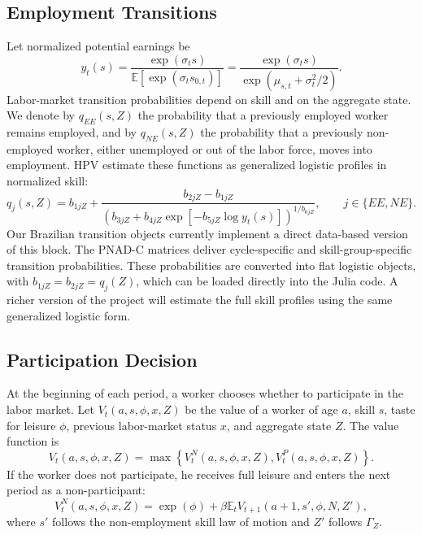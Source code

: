 \documentclass[12pt]{article}
\begin{document}
	\subsection{Employment Transitions}
	
	Let normalized potential earnings be
	\begin{equation}
		y_t(s)=\frac{\exp(\sigma_t s)}{\mathbb{E}[\exp(\sigma_t s_{0,t})]}
		=\frac{\exp(\sigma_t s)}{\exp(\mu_{s,t}+\sigma_t^2/2)}.
	\end{equation}
	Labor-market transition probabilities depend on skill and on the aggregate state. We denote by $q_{EE}(s,Z)$ the probability that a previously employed worker remains employed, and by $q_{NE}(s,Z)$ the probability that a previously non-employed worker, either unemployed or out of the labor force, moves into employment. HPV estimate these functions as generalized logistic profiles in normalized skill:
	\begin{equation}
		q_j(s,Z)=b_{1jZ}+\frac{b_{2jZ}-b_{1jZ}}
		{\left(b_{3jZ}+b_{4jZ}\exp[-b_{5jZ}\log y_t(s)]\right)^{1/b_{6jZ}}},
		\qquad j\in\{EE,NE\}.
	\end{equation}
	Our Brazilian transition objects currently implement a direct data-based version of this block. The PNAD-C matrices deliver cycle-specific and skill-group-specific transition probabilities. These probabilities are converted into flat logistic objects, with $b_{1jZ}=b_{2jZ}=q_j(Z)$, which can be loaded directly into the Julia code. A richer version of the project will estimate the full skill profiles using the same generalized logistic form.
	
	\subsection{Participation Decision}
	
	At the beginning of each period, a worker chooses whether to participate in the labor market. Let $V_t(a,s,\phi,x,Z)$ be the value of a worker of age $a$, skill $s$, taste for leisure $\phi$, previous labor-market status $x$, and aggregate state $Z$. The value function is
	\begin{equation}
		V_t(a,s,\phi,x,Z)=\max\left\{V_t^N(a,s,\phi,x,Z),V_t^P(a,s,\phi,x,Z)\right\}.
	\end{equation}
	If the worker does not participate, he receives full leisure and enters the next period as a non-participant:
	\begin{equation}
		V_t^N(a,s,\phi,x,Z)=\exp(\phi)+\beta\mathbb{E}_t
		V_{t+1}(a+1,s',\phi,N,Z'),
	\end{equation}
	where $s'$ follows the non-employment skill law of motion and $Z'$ follows $\Gamma_Z$.
	
\end{document}
